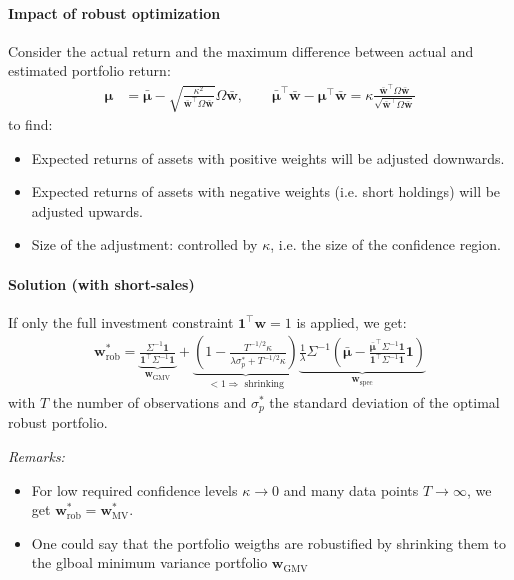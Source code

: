\documentclass[a4paper,landscape,8pt,fleqn]{scrartcl}
\begin{document}
\begin{multicols*}{3}
\paragraph{Impact of robust optimization}
Consider the actual return and the maximum difference between actual and estimated portfolio return:
\begin{align*}
\bm \mu &= \bm{\bar \mu} - \sqrt{\frac{\kappa^2}{\bm{\bar w}^\top \Omega \bm{\bar w}}} \Omega \bm{\bar w}, \qquad
\bm{\bar \mu}^\top \bm{\bar w} - \bm \mu^\top \bm{\bar w} = \kappa \frac{\bm{\bar w}^\top \Omega \bm{\bar w}}{\sqrt{\bm{\bar w}^\top \Omega \bm{\bar w}}}
\end{align*}
to find:
\begin{itemize}
\item Expected returns of assets with positive weights will be adjusted downwards.
\item Expected returns of assets with negative weights (i.e. short holdings) will be adjusted upwards.
\item Size of the adjustment: controlled by $\kappa$, i.e. the size of the confidence region.
\end{itemize}

\paragraph{Solution (with short-sales)}
If only the full investment constraint $\bm 1^\top \bm w = 1$ is applied, we get:
\begin{align*}
\bm w_\text{rob}^\ast = \underbrace{\frac{\Sigma^{-1} \bm 1}{\bm 1^\top \Sigma^{-1} \bm 1}}_{\bm w_\text{GMV}} + \underbrace{\left( 1 - \frac{T^{-1/2} \kappa}{\lambda \sigma_p^\ast + T^{-1/2} \kappa} \right)}_{< 1 \Rightarrow \text{ shrinking}} \underbrace{\frac{1}{\lambda} \Sigma^{-1} \left( \bm{\bar \mu} - \frac{\bm{\bar \mu}^\top \Sigma^{-1} \bm 1}{\bm 1^\top \Sigma^{-1} \bm 1} \bm 1 \right)}_{\bm w_\text{spec}}
\end{align*}
with $T$ the number of observations and $\sigma_p^\ast$ the standard deviation of the optimal robust portfolio.

\textit{Remarks:}
\begin{itemize}
\item For low required confidence levels $\kappa \to 0$ and many data points $T \to \infty$, we get $\bm w_\text{rob}^\ast = \bm w_\text{MV}^\ast$.
\item One could say that the portfolio weigths are robustified by shrinking them to the glboal minimum variance portfolio $\bm w_\text{GMV}$
\end{itemize}


\end{multicols*}
\end{document}
